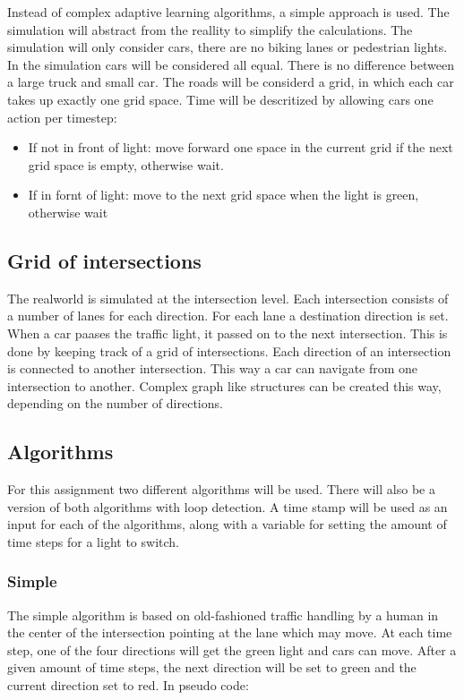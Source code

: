 \documentclass[a4paper,11pt]{article}
\begin{document}
Instead of complex adaptive learning algorithms, a simple approach is used.
The simulation will abstract from the reallity to simplify the calculations.
The simulation will only consider cars, there are no biking lanes or pedestrian lights.
In the simulation cars will be considered all equal.
There is no difference between a large truck and small car.
The roads will be considerd a grid, in which each car takes up exactly one grid space.
Time will be descritized by allowing cars one action per timestep:
\begin{itemize}
 \item If not in front of light: move forward one space in the current grid if the next grid space is empty, otherwise wait.
 \item If in fornt of light: move to the next grid space when the light is green, otherwise wait
\end{itemize}



\subsection{Grid of intersections}
The realworld is simulated at the intersection level.
Each intersection consists of a number of lanes for each direction.
For each lane a destination direction is set.
When a car paases the traffic light, it passed on to the next intersection.
This is done by keeping track of a grid of intersections.
Each direction of an intersection is connected to another intersection.
This way a car can navigate from one intersection to another.
Complex graph like structures can be created this way, depending on the number of
directions.

\subsection{Algorithms}


For this assignment two different algorithms will be used.
There will also be a version of both algorithms with loop detection.
A time stamp will be used as an input for each of the algorithms, along
with a variable for setting the amount of time steps for a light to switch.

\subsubsection*{Simple}
The simple algorithm is based on old-fashioned traffic handling by
a human in the center of the intersection pointing at the lane which may move.
At each time step, one of the four directions will get the green light and cars can move.
After a given amount of time steps, the next direction will be set to green and the current direction set to red.
In pseudo code:
\end{document}
